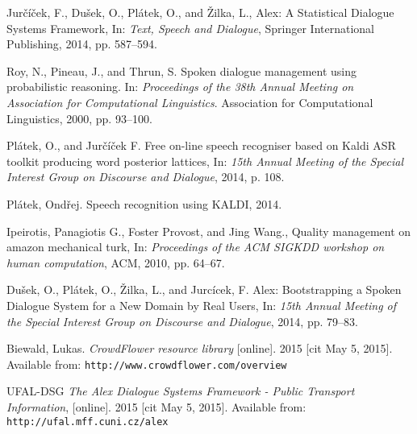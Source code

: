 
\def\bibname{Bibliography}
\begin{thebibliography}{99}
\addcontentsline{toc}{chapter}{\bibname}




{\sc Jurčíček, F., Dušek, O., Plátek, O., and Žilka, L.},
Alex: A Statistical Dialogue Systems Framework,
In: \emph{Text, Speech and Dialogue},
Springer International Publishing, 2014, pp. 587--594.


{\sc Roy, N., Pineau, J., and Thrun, S.}
Spoken dialogue management using probabilistic reasoning.
In: \emph{Proceedings of the 38th Annual Meeting on Association for Computational Linguistics}.
Association for Computational Linguistics, 2000, pp. 93--100.

{\sc Plátek, O., and Jurčíček F.}
Free on-line speech recogniser based on Kaldi ASR toolkit producing word posterior lattices,
In: \emph{15th Annual Meeting of the Special Interest Group on Discourse and Dialogue},
2014, p. 108.

{\sc Plátek, Ondřej.}
Speech recognition using KALDI,
2014.

{\sc Ipeirotis, Panagiotis G., Foster Provost, and Jing Wang.},
Quality management on amazon mechanical turk,
In: \emph{Proceedings of the ACM SIGKDD workshop on human computation},
ACM, 2010, pp. 64--67.

{\sc Dušek, O., Plátek, O., Žilka, L., and Jurcícek, F.}
Alex: Bootstrapping a Spoken Dialogue System for a New Domain by Real Users,
In: \emph{15th Annual Meeting of the Special Interest Group on Discourse and Dialogue},
2014, pp. 79--83.

{\sc Biewald, Lukas.}
\emph{CrowdFlower resource library}
[online]. 2015 [cit May 5, 2015].
Available from: \nolinkurl{http://www.crowdflower.com/overview}

{\sc UFAL-DSG}
\emph{The Alex Dialogue Systems Framework - Public Transport Information},
[online]. 2015 [cit May 5, 2015].
Available from: \nolinkurl{http://ufal.mff.cuni.cz/alex}




\end{thebibliography}
